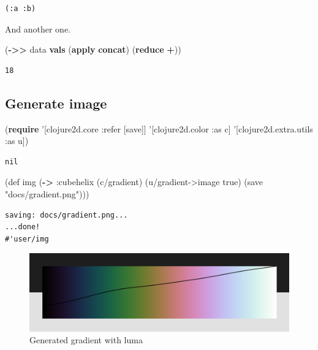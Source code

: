 \documentclass[]{article}
\newenvironment{Shaded}{\begin{snugshade}}{\end{snugshade}}
\newcommand{\KeywordTok}[1]{\textcolor[rgb]{0.13,0.29,0.53}{\textbf{#1}}}
\newcommand{\StringTok}[1]{\textcolor[rgb]{0.31,0.60,0.02}{#1}}
\newcommand{\FunctionTok}[1]{\textcolor[rgb]{0.00,0.00,0.00}{#1}}
\newcommand{\VariableTok}[1]{\textcolor[rgb]{0.00,0.00,0.00}{#1}}
\newcommand{\BuiltInTok}[1]{#1}
\newcommand{\AttributeTok}[1]{\textcolor[rgb]{0.77,0.63,0.00}{#1}}
\newcommand{\NormalTok}[1]{#1}
\begin{document}
\begin{verbatim}
(:a :b)
\end{verbatim}

And another one.

\begin{Shaded}
\begin{Highlighting}[]
\NormalTok{(}\KeywordTok{->>}\NormalTok{ data}
     \KeywordTok{vals}
\NormalTok{     (}\KeywordTok{apply} \KeywordTok{concat}\NormalTok{)}
\NormalTok{     (}\KeywordTok{reduce} \KeywordTok{+}\NormalTok{))}
\end{Highlighting}
\end{Shaded}

\begin{verbatim}
18
\end{verbatim}

\subsection{Generate image}\label{generate-image}

\begin{Shaded}
\begin{Highlighting}[]
\NormalTok{(}\KeywordTok{require}\NormalTok{ '[clojure2d.core }\AttributeTok{:refer}\NormalTok{ [save]]}
\NormalTok{         '[clojure2d.color }\AttributeTok{:as}\NormalTok{ c]}
\NormalTok{         '[clojure2d.extra.utils }\AttributeTok{:as}\NormalTok{ u])}
\end{Highlighting}
\end{Shaded}

\begin{verbatim}
nil
\end{verbatim}

\begin{Shaded}
\begin{Highlighting}[]
\NormalTok{(}\BuiltInTok{def}\FunctionTok{ img }\NormalTok{(}\KeywordTok{->} \AttributeTok{:cubehelix}
\NormalTok{             (c/gradient)}
\NormalTok{             (u/gradient->image }\VariableTok{true}\NormalTok{)}
\NormalTok{             (save }\StringTok{"docs/gradient.png"}\NormalTok{)))}
\end{Highlighting}
\end{Shaded}

\begin{verbatim}
saving: docs/gradient.png...
...done!
#'user/img
\end{verbatim}

\begin{figure}
\centering
\includegraphics{gradient.png}
\caption{Generated gradient with luma}
\end{figure}
\end{document}
